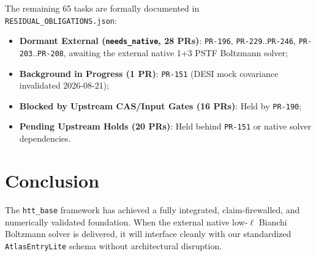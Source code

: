 \documentclass[11pt,a4paper]{article}
\begin{document}
The remaining 65 tasks are formally documented in \texttt{RESIDUAL\_OBLIGATIONS.json}:
\begin{itemize}
    \item \textbf{Dormant External (\texttt{needs\_native}, 28 PRs)}: \texttt{PR-196}, \texttt{PR-229}..\texttt{PR-246}, \texttt{PR-203}..\texttt{PR-208}, awaiting the external native 1+3 PSTF Boltzmann solver;
    \item \textbf{Background in Progress (1 PR)}: \texttt{PR-151} (DESI mock covariance invalidated 2026-08-21);
    \item \textbf{Blocked by Upstream CAS/Input Gates (16 PRs)}: Held by \texttt{PR-190};
    \item \textbf{Pending Upstream Holds (20 PRs)}: Held behind \texttt{PR-151} or native solver dependencies.
\end{itemize}

\section{Conclusion}

The \texttt{htt\_base} framework has achieved a fully integrated, claim-firewalled, and numerically validated foundation. When the external native low-$\ell$ Bianchi Boltzmann solver is delivered, it will interface cleanly with our standardized \texttt{AtlasEntryLite} schema without architectural disruption.
\end{document}
